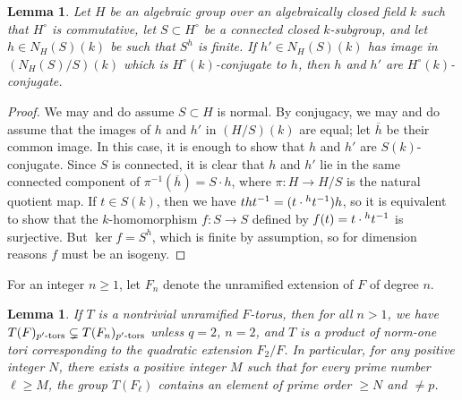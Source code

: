 \documentclass[reqno]{amsart}
\numberwithin{equation}{subsection}
\newcommand{\ol}[1]{\overline{#1}}
\newcommand{\co}{\colon}
\newtheorem{lemma}[thm]{Lemma}
\theoremstyle{remark}
\numberwithin{equation}{subsection}
\numberwithin{figure}{subsection}
\begin{document}
\begin{lemma}\label{lemma:conjugate-weyl-elements}
    Let $H$ be an algebraic group over an algebraically closed field $k$ such that $H^\circ$ is commutative, let $S \subset H^\circ$ be a connected closed $k$-subgroup, and let $h \in N_H(S)(k)$ be such that $S^h$ is finite. If $h' \in N_H(S)(k)$ has image in $(N_H(S)/S)(k)$ which is $H^\circ(k)$-conjugate to $h$, then $h$ and $h'$ are $H^\circ(k)$-conjugate.
\end{lemma}

\begin{proof}
    We may and do assume $S \subset H$ is normal. By conjugacy, we may and do assume that the images of $h$ and $h'$ in $(H/S)(k)$ are equal; let $\ol h$ be their common image. In this case, it is enough to show that $h$ and $h'$ are $S(k)$-conjugate. Since $S$ is connected, it is clear that $h$ and $h'$ lie in the same connected component of $\pi^{-1}(\ol h) = S \cdot h$, where $\pi\co H \to H/S$ is the natural quotient map. If $t \in S(k)$, then we have $tht^{-1} = (t \cdot \prescript{h}{}{t}^{-1}) h$, so it is equivalent to show that the $k$-homomorphism $f\colon S \to S$ defined by $f(t) = t \cdot \prescript{h}{}{t}^{-1}$ is surjective. But $\ker f = S^h$, which is finite by assumption, so for dimension reasons $f$ must be an isogeny.
\end{proof}

For an integer $n \geq 1$, let $F_n$ denote the unramified extension of $F$ of degree $n$.

\begin{lemma}\label{lemma:torus-torsion-grows} 
    If $T$ is a nontrivial unramified $F$-torus, then for all $n > 1$, we have $T(F)_{p'\textrm{-}\rm{tors}} \subsetneq T(F_n)_{p'\textrm{-}\rm{tors}}$ unless $q = 2$, $n = 2$, and $T$ is a product of norm-one tori corresponding to the quadratic extension $F_2/F$. In particular, for any positive integer $N$, there exists a positive integer $M$ such that for every prime number $\ell \geq M$, the group $T(F_\ell)$ contains an element of prime order $\geq N$ and $\neq p$.
\end{lemma}
\end{document}
